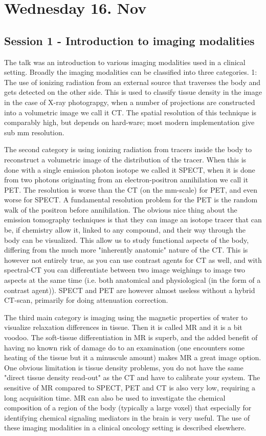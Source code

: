 \documentclass[12p]{article}
\begin{document}
\section*{Wednesday 16. Nov}

\subsection*{Session 1 - Introduction to imaging modalities}

The talk was an introduction to various imaging modalities used in a clinical setting.
Broadly the imaging modalities can be classified into three categories.
1: The use of ionizing radiation from an external source that traverses the body and gets detected on the other side.
This is used to classify tissue density in the image in the case of X-ray photograpgy, when a number of projections are constructed into a volumetric image we call it CT.
The spatial resolution of this technique is comparably high, but depends on hard-ware; most modern implementation give sub mm resolution.

The second category is using ionizing radiation from tracers inside the body to reconstruct a volumetric image of the distribution of the tracer.
When this is done with a single emission photon isotope we called it SPECT, when it is done from two photons originating from an electron-positron annihilation we call it PET.
The resolution is worse than the CT (on the mm-scale) for PET, and even worse for SPECT.
A fundamental resolution problem for the PET is the random walk of the positron before annihilation.
The obvious nice thing about the emission tomography techniques is that they can image an isotope tracer that can be, if chemistry allow it, linked to any compound, and their way through the body can be visualized.
This allow us to study functional aspects of the body, differing from the much more "inherently anatomic" nature of the CT.
This is however not entirely true, as you can use contrast agents for CT as well, and with spectral-CT you can differentiate between two image weighings to image two aspects at the same time (i.e. both anatomical and physiological (in the form of a contrast agent)).
SPECT and PET are however almost useless without a hybrid CT-scan, primarily for doing attenuation correction.

The third main category is imaging using the magnetic properties of water to visualize relaxation differences in tissue.
Then it is called MR and it is a bit voodoo. 
The soft-tissue differentiation in MR is superb, and the added benefit of having no known risk of damage do to an examination (one encounters some heating of the tissue but it a minuscule amount) makes MR a great image option.
One obvious limitation is tissue density problems, you do not have the same "direct tissue density read-out" as the CT and have to calibrate your system.
The sensitive of MR compared to SPECT, PET and CT is also very low, requiring a long acquisition time.
MR can also be used to investigate the chemical composition of a region of the body (typically a large voxel) that especially for identifying chemical signaling mediators in the brain is very useful.
The use of these imaging modalities in a clinical oncology setting is described elsewhere.
\end{document}
